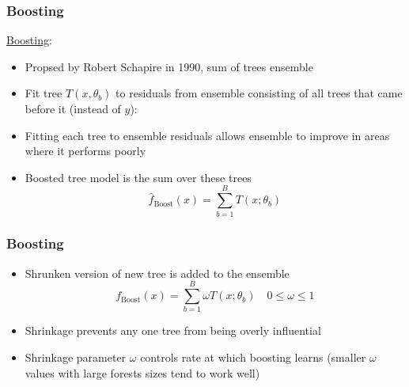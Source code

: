 \documentclass{beamer}
\begin{document}
\begin{frame}

    \frametitle{Boosting}
    
    \underline{Boosting}:
    \medskip
    
    \begin{itemize}
        \small
        \item Propsed by Robert Schapire in 1990, sum of trees ensemble
        \item Fit tree $T(x, \theta_b)$ to residuals from ensemble consisting of 
              all trees that came before it (instead of $y$):
        \item Fitting each tree to ensemble residuals allows ensemble
              to improve in areas where it performs poorly
        \item Boosted tree model is the sum over these trees
        \begin{equation}
            \hat{f}_\text{Boost}(x) = \sum_{b=1}^B T(x; \theta_b)
        \end{equation}
    \end{itemize}


\end{frame}



\begin{frame}

    \frametitle{Boosting}

    \begin{itemize}
        \item Shrunken version of new tree is added to the ensemble
              \begin{equation}
                f_\text{Boost}(x) = \sum_{b=1}^B \omega T(x; \theta_b)
                \quad 0 \le \omega \le 1
              \end{equation}
        \item Shrinkage prevents any one tree from being overly influential
        \medskip
        \item Shrinkage parameter $\omega$ controls rate at which
              boosting learns (smaller $\omega$ values with large forests sizes
              tend to work well)
    \end{itemize}


\end{frame}
\end{document}
